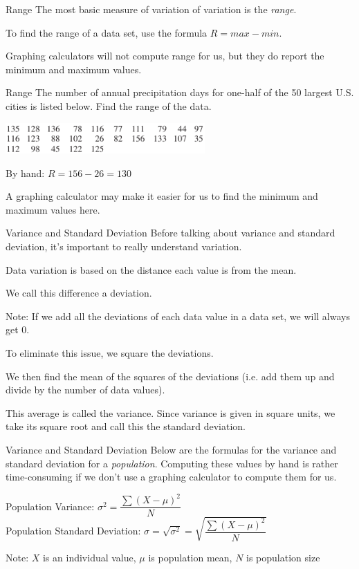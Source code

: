 \documentclass[t, aspectratio=169]{beamer}
\newcommand{\?}{\stackrel{?}{=}}
\begin{document}
	\begin{frame}{Range}
		The most basic measure of variation of variation is the \textit{range}. \pause
		
		To find the range of a data set, use the formula $R = max - min$. \pause
		
		Graphing calculators will not compute range for us, but they do report the minimum and maximum values.
	\end{frame}

	\begin{frame}{Range}
		The number of annual precipitation days  for one-half of the 50 largest U.S. cities is listed below. Find the range of the data.
		
		\includegraphics[width=3in]{precip-data.png} \pause
		
		By hand: $R = 156 - 26 = 130$ \pause
		
		A graphing calculator may make it easier for us to find the minimum and maximum values here.
	\end{frame}

	\begin{frame}{Variance and Standard Deviation}
		Before talking about variance and standard deviation, it's important to really understand variation. \pause
		
		Data variation is based on the distance each value is from the mean. \pause
		
		We call this difference a deviation. \pause
		
		Note: If we add all the deviations of each data value in a data set, we will always get 0. \pause
		
		To eliminate this issue, we square the deviations. \pause
		
		We then find the mean of the squares of the deviations (i.e. add them up and divide by the number of data values). \pause
		
		This average is called the variance. Since variance is given in square units, we take its square root and call this the standard deviation.
	\end{frame}

	\begin{frame}{Variance and Standard Deviation}
		Below are the formulas for the variance and standard deviation for a \textit{population}. Computing these values by hand is rather time-consuming if we don't use a graphing calculator to compute them for us. \pause
		
		Population Variance: $\sigma^2 = \dfrac{\sum (X - \mu)^2}{N}$ \\
		Population Standard Deviation: $\sigma = \sqrt{\sigma^2} = \sqrt{\dfrac{\sum (X - \mu)^2}{N}}$ \pause
		
		Note: $X$ is an individual value, $\mu$ is population mean, $N$ is population size
	\end{frame}
\end{document}
